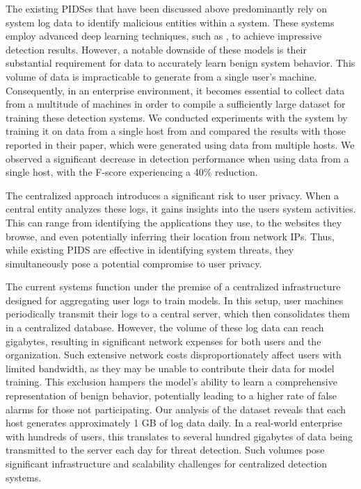 
 The existing PIDSes that have been discussed above predominantly rely on system log data to identify malicious entities within a system. These systems employ advanced deep learning techniques, such as \gnn, to achieve impressive detection results. However, a notable downside of these models is their substantial requirement for data to accurately learn benign system behavior. This volume of data is impracticable to generate from a single user's machine. Consequently, in an enterprise environment, it becomes essential to collect data from a multitude of machines in order to compile a sufficiently large dataset for training these detection systems.  We conducted experiments with the \flash system by training it on data from a single host from \optc and compared the results with those reported in their paper, which were generated using data from multiple hosts. We observed a significant decrease in detection performance when using data from a single host, with the F-score experiencing a 40\% reduction.

The centralized approach introduces a significant risk to user privacy. When a central entity analyzes these logs, it gains insights into the users system activities. This can range from identifying the applications they use, to the websites they browse, and even potentially inferring their location from network IPs. Thus, while existing PIDS are effective in identifying system threats, they simultaneously pose a potential compromise to user privacy.


 The current systems function under the premise of a centralized infrastructure designed for aggregating user logs to train models. In this setup, user machines periodically transmit their logs to a central server, which then consolidates them in a centralized database. However, the volume of these log data can reach gigabytes, resulting in significant network expenses for both users and the organization. Such extensive network costs disproportionately affect users with limited bandwidth, as they may be unable to contribute their data for model training. This exclusion hampers the model's ability to learn a comprehensive representation of benign behavior, potentially leading to a higher rate of false alarms for those not participating. Our analysis of the \optc dataset reveals that each host generates approximately 1 GB of log data daily. In a real-world enterprise with hundreds of users, this translates to several hundred gigabytes of data being transmitted to the server each day for threat detection. Such volumes pose significant infrastructure and scalability challenges for centralized detection systems.

